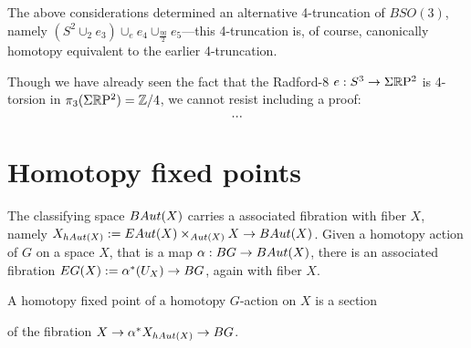 \documentclass{amsart}
\begin{document}
\begin{remark}
The above considerations determined an alternative 4-truncation of $BSO(3)$, namely $(S^2 \cup_2 e_3) \cup_{e} e_4 \cup_{\frac{\eta q}{2}} e_5$---this 4-truncation is, of course, canonically homotopy equivalent to the earlier 4-truncation.  %
\end{remark}

\begin{remark}
Though we have already seen the fact that the Radford-8 $e: S^3 \rightarrow \Sigma\mathbb R \mathrm{P}^2$ is 4-torsion in $\pi_3(\Sigma \mathbb R \mathrm{P}^2) = \mathbb Z/4$, we cannot resist including a proof: 
\begin{equation} \nonumber
...
\end{equation}
\end{remark}


\section{Homotopy fixed points}


The classifying space $BAut(X)$ carries a associated fibration with fiber $X$, namely $X_{hAut(X)} := EAut(X) \times_{Aut(X)} X \rightarrow BAut(X)$.    Given a homotopy action of $G$ on a space $X$, that is a map $\alpha: BG \rightarrow BAut(X)$, there is an associated fibration $EG(X):=\alpha^\ast(U_X) \rightarrow BG$, again with fiber $X$.

\begin{definition}
A homotopy fixed point of a homotopy $G$-action on $X$ is a section
\begin{center}
\end{center}
of the fibration $X \rightarrow \alpha^*X_{hAut(X)} \rightarrow BG$.
\end{definition}
\end{document}
